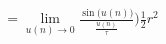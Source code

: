 \documentclass[preview]{standalone}
\begin{document}
\begin{align*}
= \lim_{u(n) \to 0} \frac {\sin \big( u(n)\big)} {\frac {u(n)}{\tau} } \big) \frac {1} {2} r^2
\end{align*}
\end{document}
